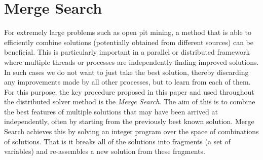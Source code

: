 \documentclass[journal]{IEEEtran}
\begin{document}


\section{Merge Search}\label{sec:merge}
For extremely large problems such as open pit mining, a method that is able to efficiently combine solutions (potentially obtained from different sources) can be beneficial. This is particularly important in a parallel or distributed framework where multiple threads or processes are independently finding improved solutions. In such cases we do not want to just take the best solution, thereby discarding any improvements made by all other processes, but to learn from each of them. For this purpose, the key procedure proposed in this paper and used throughout 
the distributed solver method is the {\it Merge Search}. The aim of this is to combine the best features of multiple solutions that may have been 
arrived at independently, often by starting from the previously best known solution. Merge Search achieves this by solving an integer program over the space of combinations of solutions. That is it breaks all of the solutions into fragments (a set of variables) and re-assembles a new solution from these fragments. 
\end{document}
